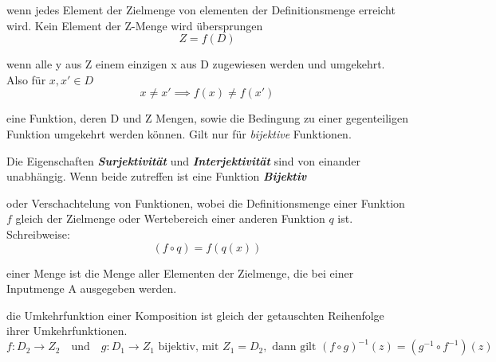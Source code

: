 \begin{definition}
    [Surjetivität] wenn jedes Element der Zielmenge von elementen der Definitionsmenge erreicht wird. Kein Element der Z-Menge wird übersprungen 
    \begin{equation}
        Z = f(D)
    \end{equation}
\end{definition}

\begin{definition}
    [Interjektivität] wenn alle y aus Z einem einzigen x aus D zugewiesen werden und umgekehrt. Also für $x,x' \in D$
    \begin{equation}
        x \neq x' \implies f(x) \neq f(x')
    \end{equation} 
\end{definition}

\begin{definition}
    [Umkehrfunktion] eine Funktion, deren D und Z Mengen, sowie die Bedingung zu einer gegenteiligen Funktion umgekehrt werden können. Gilt nur für \textit{bijektive} Funktionen.
\end{definition}
Die Eigenschaften \textit{\textbf{Surjektivität}} und \textit{\textbf{Interjektivität}} sind von einander unabhängig. Wenn beide zutreffen ist eine Funktion \textit{\textbf{Bijektiv}}

\begin{definition}
    [Komposition] oder Verschachtelung von Funktionen, wobei die Definitionsmenge einer Funktion $f$ gleich der Zielmenge oder Wertebereich einer anderen Funktion $q$ ist. Schreibweise:
    \begin{equation}
        (f \circ q) = f(q(x)) 
    \end{equation}
\end{definition}

\begin{definition}
    [Bild] einer Menge ist die Menge aller Elementen der Zielmenge, die bei einer Inputmenge A ausgegeben werden.
\end{definition}

\begin{theorem}
     die Umkehrfunktion einer Komposition ist gleich der getauschten Reihenfolge ihrer Umkehrfunktionen.
    \begin{equation}
        f: D_2 \rightarrow Z_2 \quad \text{und} \quad g: D_1 \rightarrow Z_1 \text{ bijektiv, mit } Z_1 = D_2, \text{ dann gilt }
        (f \circ g)^{-1}(z) = (g^{-1} \circ f^{-1})(z)
    \end{equation}
\end{theorem}
